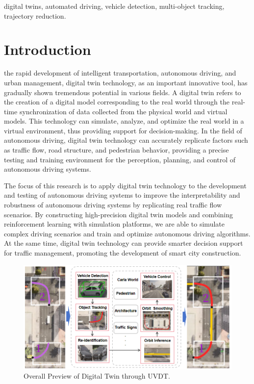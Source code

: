 \documentclass[lettersize,journal]{IEEEtran}
\begin{document}
\begin{IEEEkeywords}
digital twins, automated driving, vehicle detection, multi-object tracking, trajectory reduction.
\end{IEEEkeywords}


\section{Introduction}

 the rapid development of intelligent transportation, autonomous driving, and urban management, digital twin technology, as an important innovative tool, has gradually shown tremendous potential in various fields\cite{Alpher17}. 
A digital twin refers to the creation of a digital model corresponding to the real world through the real-time synchronization of data collected from the physical world and virtual models\cite{Alpher20c}. 
This technology can simulate, analyze, and optimize the real world in a virtual environment, thus providing support for decision-making\cite{Alpher21b}. 
In the field of autonomous driving, digital twin technology can accurately replicate factors such as traffic flow, road structure, and pedestrian behavior, providing a precise testing and training environment for the perception, planning, and control of autonomous driving systems\cite{Alpher24}\cite{Alpher20d}.

The focus of this research is to apply digital twin technology to the development and testing of autonomous driving systems to improve the interpretability and robustness of autonomous driving systems by replicating real traffic flow scenarios\cite{Alpher24b}.
By constructing high-precision digital twin models and combining reinforcement learning with simulation platforms, we are able to simulate complex driving scenarios and train and optimize autonomous driving algorithms\cite{Alpher22c}. 
At the same time, digital twin technology can provide smarter decision support for traffic management, promoting the development of smart city construction\cite{Alpher17b}.

\begin{figure}[t]
	\centering
	\includegraphics[width=\linewidth]{picture/picture1.png} 
	\caption{Overall Preview of Digital Twin through UVDT.} 
	\label{fig:example} 
\end{figure}
\end{document}
